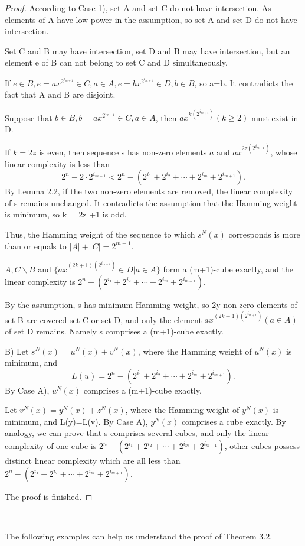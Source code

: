 \documentclass[10pt,conference,twocolumn]{IEEEtran}
\begin{document}
\begin{proof}
According to Case 1), set A and set C do not have intersection. As
elements of A have low power in the assumption, so set A and set D
do not have intersection.

Set C and B may have intersection, set D and B may have
intersection, but an element e of B can not belong to set C and D
simultaneously.

If $e\in B, e=ax^{2^{i_{m+1}}}\in C, a\in A, e=bx^{2^{i_{m+1}}}\in
D, b\in B$, so a=b. It contradicts the fact that A and B are
disjoint.

Suppose that $b\in B, b=ax^{2^{i_{m+1}}}\in C, a\in A$, then
$ax^{k(2^{i_{m+1}})}(k\ge2)$ must exist in D.

If $k = 2z$ is even, then sequence s has non-zero elements $a$ and
$ax^{2z(2^{i_{m+1}})}$, whose linear complexity is less than
$$2^n-2\cdot2^{i_{m+1}}<2^n-(2^{i_1}+2^{i_2}+\cdots+2^{i_m}+2^{i_{m+1}}).$$
By Lemma 2.2, if the two non-zero elements are removed, the linear
complexity of s remains unchanged. It contradicts the assumption
that the Hamming weight is minimum, so k = 2z +1 is odd.

Thus, the Hamming weight of the sequence to which $s^N(x)$
corresponds is more than or equals to  $|A|+|C|=2^{m+1}$.

$A, C\backslash B$ and $\{ax^{(2k+1)(2^{i_{m+1}})}\in D|a\in A \}$
form a (m+1)-cube exactly, and the linear complexity is
$2^n-(2^{i_1}+2^{i_2}+\cdots+2^{i_m}+2^{i_{m+1}})$.

By the assumption, s has minimum Hamming weight, so 2y non-zero
elements of set B are covered set C or set D, and only the element
$ax^{(2k+1)(2^{i_{m+1}})}(a\in A)$ of set D remains. Namely s
comprises a (m+1)-cube exactly.

B) Let $s^N(x)= u^N(x)+ v^N(x)$, where the Hamming weight of
$u^N(x)$ is minimum, and
$$L(u)=2^n-(2^{i_1}+2^{i_2}+\cdots+2^{i_m}+2^{i_{m+1}}).$$ By Case A),
$u^N(x)$ comprises a (m+1)-cube exactly.

Let $v^N(x)= y^N(x)+ z^N(x)$, where the Hamming weight of $y^N(x)$
is minimum, and L(y)=L(v). By Case A), $y^N(x)$ comprises a cube
exactly. By analogy, we can prove that s comprises several cubes,
and only the linear complexity of one cube is
$2^n-(2^{i_1}+2^{i_2}+\cdots+2^{i_m}+2^{i_{m+1}})$, other cubes
possess distinct linear complexity which are all less than
$2^n-(2^{i_1}+2^{i_2}+\cdots+2^{i_m}+2^{i_{m+1}})$.

The proof is finished.
\end{proof}\

The following examples can help us understand the proof of Theorem
3.2.
\end{document}
